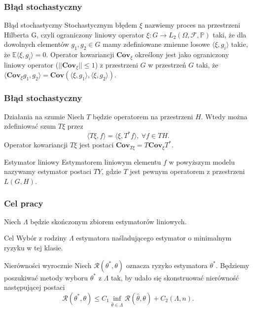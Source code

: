 \documentclass{beamer}
\begin{document}
\begin{frame}\frametitle{Błąd stochastyczny}
\begin{block}{Błąd stochastyczny}
Stochastycznym błędem $\xi$ nazwiemy proces na przestrzeni Hilberta G, czyli ograniczony liniowy operator $\xi\colon G\to L_2(\Omega, \mathcal{F},\mathbb{P})$ taki, że dla dowolnych elementów $g_1,g_2\in G$ mamy zdefiniowane zmienne losowe $\langle \xi, g_i\rangle$ takie, że $\mathbb{E}\langle \xi, g_i\rangle =0$. Operator kowariancji $\textbf{Cov}_{\xi}$ określony jest jako ograniczony liniowy operator ($||\textbf{Cov}_{\xi}||\leq 1$) z przestrzeni $G$ w przestrzeń $G$ taki, że $ \langle \textbf{Cov}_{\xi}g_1,g_2\rangle=\textbf{Cov}(\langle \xi,g_1\rangle,\langle \xi,g_2\rangle)$. 
\end{block}
\end{frame}


\begin{frame}\frametitle{Błąd stochastyczny}
\begin{block}{Działania na szumie}
Niech $T$ będzie operatorem na przestrzeni $H$. Wtedy można zdefiniować szum $T\xi$ przez
\begin{displaymath}
\langle T\xi , f\rangle=\langle \xi, T^* f\rangle,\ \forall f\in TH.
\end{displaymath}
Operator kowariancji $T\xi$ jest postaci $\textbf{Cov}_{T\xi}=T\textbf{Cov}_{\xi}T^*$.
\end{block}
\begin{block}{Estymator liniowy}
Estymatorem liniowym elementu $f$ w powyższym modelu nazywamy estymator postaci $TY$, gdzie $T$ jest pewnym operatorem z przestrzeni $L(G,H)$. 
\end{block}
\end{frame}


\begin{frame}\frametitle{Cel pracy}
\begin{center}
Niech $\Lambda$ będzie skończonym zbiorem estymatorów liniowych.
\end{center}
\begin{block}{Cel}
Wybór z rodziny $\Lambda$ estymatora naśladującego estymator o minimalnym ryzyku w tej klasie.
\end{block}
\begin{block}{Nierówności wyrocznie}
Niech $\mathcal{R}(\theta^*,\theta)$ oznacza ryzyko estymatora $\theta^*$. Będziemy poszukiwać metody wyboru $\theta^*$ z $\Lambda$ tak, by udało się skonstruować nierówność następującej postaci
\begin{displaymath}
\mathcal{R}(\theta^*,\theta)\leq C_1 \inf_{\hat{\theta} \in \Lambda}\mathcal{R}(\hat{\theta},\theta)+C_2(\Lambda,n).
\end{displaymath}
\end{block}
\end{frame}
\end{document}
